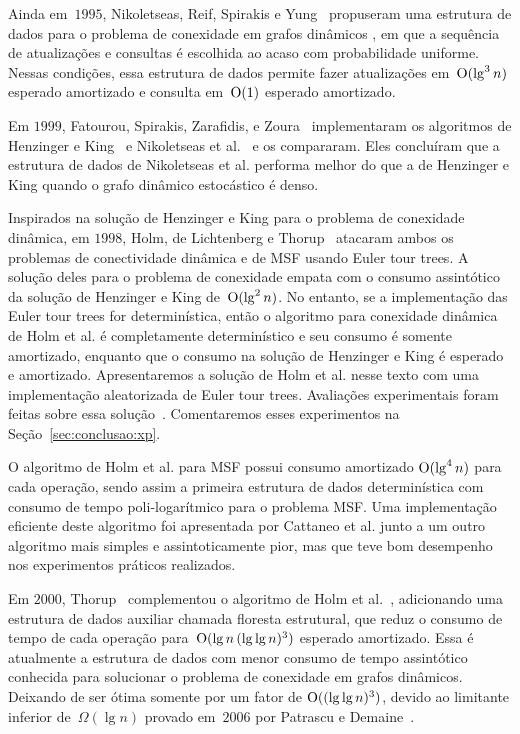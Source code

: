 Ainda em~$1995$, Nikoletseas, Reif, Spirakis e Yung~\cite{NikoletseasRSY} propuseram uma estrutura de dados para o problema de conexidade em grafos dinâmicos , em que a sequência de atualizações e consultas é escolhida ao acaso com probabilidade uniforme.
Nessas condições, essa estrutura de dados permite fazer atualizações em~$\mathrm{O}(\lg^3 n)$ esperado amortizado e consulta em~$\mathrm{O}(1)$ esperado amortizado.

Em $1999$, Fatourou, Spirakis, Zarafidis, e Zoura~\cite{Fatourou} implementaram os algoritmos de Henzinger e King~\cite{HenzingerKing} e Nikoletseas et al.~\cite{NikoletseasRSY} e os compararam. Eles concluíram que a estrutura de dados de Nikoletseas et al. performa melhor do que a de Henzinger e King quando o grafo dinâmico estocástico é denso.

Inspirados na solução de Henzinger e King para o problema de conexidade dinâmica, em $1998$, Holm, de Lichtenberg e Thorup~\cite{poly_log} atacaram ambos os problemas de conectividade dinâmica e de MSF usando Euler tour trees.
A solução deles para o problema de conexidade empata com o consumo assintótico da solução de Henzinger e King de~$\mathrm{O}(\lg^2 n)$.
No entanto, se a implementação das Euler tour trees for determinística, então o algoritmo para conexidade dinâmica de Holm et al. é completamente determinístico e seu consumo é somente amortizado,
enquanto que o consumo na solução de Henzinger e King é esperado e amortizado. 
Apresentaremos a solução de Holm et al. nesse texto com uma implementação aleatorizada de Euler tour trees.
Avaliações experimentais foram feitas sobre essa solução~\cite{EmpiricalStudy1997, EmpiricalStudy2002,xp-Phylogeny}.
Comentaremos esses experimentos na Seção~\ref{sec:conclusao:xp}.

O algoritmo de Holm et al. para MSF possui consumo amortizado $\mathrm{O}(\lg^4 n)$ para cada operação, sendo assim a primeira estrutura de dados determinística com consumo de tempo poli-logarítmico para o problema MSF. Uma implementação eficiente deste algoritmo foi apresentada por Cattaneo et al. \cite{xpstudy2002} junto a um outro algoritmo mais simples e assintoticamente pior, mas que teve bom desempenho nos experimentos práticos realizados.

Em $2000$, Thorup~\cite{Thorup2000} complementou o algoritmo de Holm et al.~\cite{poly_log}, adicionando uma estrutura de dados auxiliar chamada floresta estrutural, que reduz o consumo de tempo de cada operação para~$\mathrm{O}(\lg n\, (\lg\lg n)^3)$ esperado amortizado.
Essa é atualmente a estrutura de dados com menor consumo de tempo assintótico conhecida para solucionar o problema de conexidade em grafos dinâmicos.
Deixando de ser ótima somente por um fator de $\mathrm{O}((\lg\lg n)^3)$, devido ao limitante inferior de~$\Omega(\lg n)$ provado em~$2006$ por Patrascu e Demaine~\cite{lowerBoundPatrascu}.

